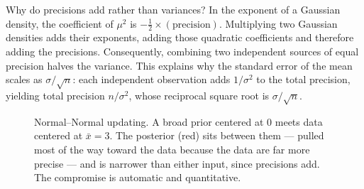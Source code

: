 \begin{whybox}
Why do precisions add rather than variances? In the exponent of a Gaussian density,
the coefficient of $\mu^2$ is $-\tfrac12 \times (\text{precision})$. Multiplying two
Gaussian densities adds their exponents, adding those quadratic coefficients and therefore
adding the precisions. Consequently, combining two independent sources of equal precision
halves the variance. This explains why the standard error of the mean scales as
$\sigma/\sqrt n$: each independent observation adds $1/\sigma^2$ to the total precision,
yielding total precision $n/\sigma^2$, whose reciprocal square root is $\sigma/\sqrt n$.
\end{whybox}

\begin{figure}[H]
\centering
{}
\caption{Normal--Normal updating. A broad prior centered at $0$ meets data centered at
$\bar x = 3$. The posterior (red) sits between them --- pulled most of the way toward the
data because the data are far more precise --- and is narrower than either input, since
precisions add. The compromise is automatic and quantitative.}
\label{ch31:fig-normalnormal}
\end{figure}

